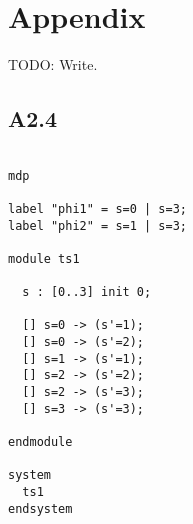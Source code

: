 
\section{Appendix}

TODO: Write.

\subsection{A2.4}

\begin{verbatim}

mdp

label "phi1" = s=0 | s=3;
label "phi2" = s=1 | s=3;

module ts1
  
  s : [0..3] init 0;

  [] s=0 -> (s'=1);
  [] s=0 -> (s'=2);
  [] s=1 -> (s'=1);
  [] s=2 -> (s'=2);
  [] s=2 -> (s'=3);
  [] s=3 -> (s'=3);

endmodule

system
  ts1
endsystem

\end{verbatim}

